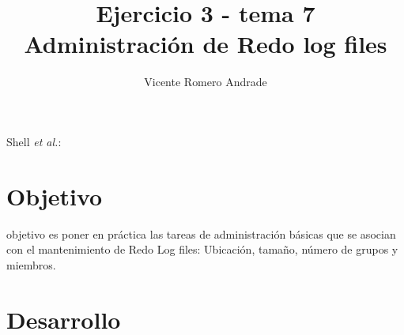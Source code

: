\documentclass[journal]{IEEEtran}
\begin{document}
\title{Ejercicio 3 - tema 7 \\ Administración de Redo log files}
%
\author{Vicente Romero Andrade}

%
{Shell \MakeLowercase{\textit{et al.}}: }

\maketitle


\IEEEpeerreviewmaketitle

\section{Objetivo}

 objetivo es poner en práctica las tareas de administración 
básicas que se asocian con el mantenimiento de Redo Log files: 
Ubicación, tamaño, número de grupos y miembros.

\section{Desarrollo}
\end{document}
